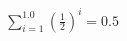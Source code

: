 \documentclass[preview]{standalone}
\begin{document}
\begin{align*}
\sum_{i=1}^{1.0} (\frac{1}{2})^i = {0.5}
\end{align*}
\end{document}
